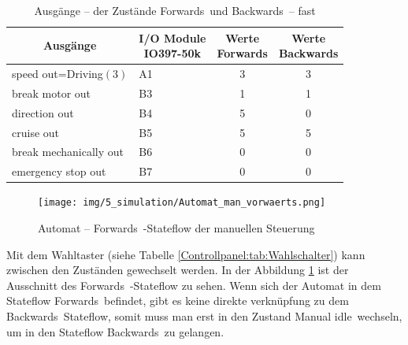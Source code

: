\pagebreak[1]
\begin{table}[!ht]
	\centering
	\caption{Ausgänge – der Zustände \frqq Forwards\flqq\ und \frqq Backwards\flqq\ –  \frqq fast\flqq}
	\label{Automat_man:tab:z_V_schnell}
	\begin{tabular}{cccc}
		\hline
		\textbf{Ausgänge}                           & \makecell{\textbf{I/O Module}         \\ \textbf{IO397-50k}}    & \makecell{\textbf{Werte}     \\ \textbf{\frqq Forwards\flqq}} & \makecell{\textbf{Werte}     \\ \textbf{\frqq Backwards\flqq}} \\ \hline
		\multicolumn{1}{l|}{speed out=Driving$(3)$} & \multicolumn{1}{l|}{A1}       & 3 & 3 \\
		\multicolumn{1}{l|}{break motor out}        & \multicolumn{1}{l|}{B3}       & 1 & 1 \\
		\multicolumn{1}{l|}{direction out}          & \multicolumn{1}{l|}{B4}       & 5 & 0 \\
		\multicolumn{1}{l|}{cruise out}             & \multicolumn{1}{l|}{B5}       & 5 & 5 \\
		\multicolumn{1}{l|}{break mechanically out} & \multicolumn{1}{l|}{B6}       & 0 & 0 \\
		\multicolumn{1}{l|}{emergency stop out}     & \multicolumn{1}{l|}{B7}       & 0 & 0 \\ \hline
	\end{tabular}
\end{table}
\pagebreak[1]

\pagebreak[1]
\begin{figure}[!ht]
	\begin{center}
		\texttt{[image: img/5\_simulation/Automat\_man\_vorwaerts.png]}
		\caption{Automat – \frqq Forwards\flqq\ -Stateflow der manuellen Steuerung}
		\label{Automat_man:img:man_vorwärts}
	\end{center}
\end{figure}
\pagebreak[1]



Mit dem Wahltaster (siehe Tabelle \ref{Controllpanel:tab:Wahlschalter}) kann zwischen den Zuständen gewechselt werden. In der Abbildung \ref{Automat_man:img:man_vorwärts} ist der Ausschnitt des \frqq Forwards\flqq\ -Stateflow zu sehen. Wenn sich der Automat in dem Stateflow \frqq Forwards\flqq\ befindet, gibt es keine direkte verknüpfung zu dem \frqq Backwards\flqq\ Stateflow, somit muss man erst in den Zustand \frqq Manual idle\flqq\ wechseln, um in den Stateflow \frqq Backwards\flqq\ zu gelangen.

